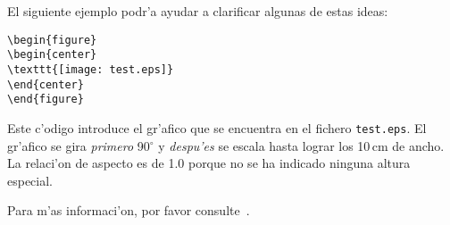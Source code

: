 El siguiente ejemplo podr'a ayudar a clarificar algunas de estas ideas:
\begin{code}
\begin{verbatim}
\begin{figure}
\begin{center}
\texttt{[image: test.eps]}
\end{center}
\end{figure}
\end{verbatim}
\end{code}
Este c'odigo introduce el gr'afico que se encuentra en el fichero
\texttt{test.eps}. El gr'afico se gira \emph{primero} 90$^\circ$ y
\emph{despu'es} se escala hasta lograr los 10\,cm de ancho. La
relaci'on de aspecto es de 1.0 porque no se ha indicado ninguna altura
especial.


Para m'as informaci'on, por favor consulte~\cite{graphics}.  

\endinput
